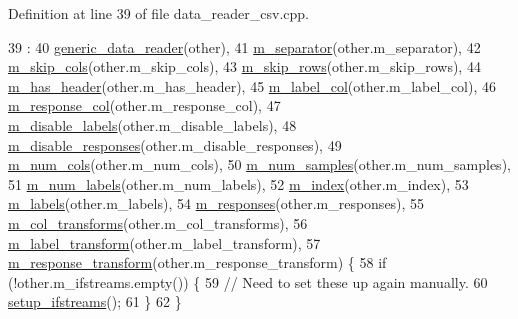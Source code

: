 Definition at line 39 of file data\+\_\+reader\+\_\+csv.\+cpp.


\begin{DoxyCode}
39                                               :
40   \hyperlink{classlbann_1_1generic__data__reader_aaba933b8f7c1227801f6e80d39986af4}{generic\_data\_reader}(other),
41   \hyperlink{classlbann_1_1csv__reader_abab4a731daa751856f083c117ac8862a}{m\_separator}(other.m\_separator),
42   \hyperlink{classlbann_1_1csv__reader_a3a6cb698fbeb4abd0032e2b018bbb326}{m\_skip\_cols}(other.m\_skip\_cols),
43   \hyperlink{classlbann_1_1csv__reader_a52b9eebd06309a8d8858ce74ecd8cce0}{m\_skip\_rows}(other.m\_skip\_rows),
44   \hyperlink{classlbann_1_1csv__reader_a36d5e554882e8a32e1d111701af3bd90}{m\_has\_header}(other.m\_has\_header),
45   \hyperlink{classlbann_1_1csv__reader_acc02e56c81421c4507f7178ca8461b04}{m\_label\_col}(other.m\_label\_col),
46   \hyperlink{classlbann_1_1csv__reader_a1cfa3562ecd0a7f6358290f299de5812}{m\_response\_col}(other.m\_response\_col),
47   \hyperlink{classlbann_1_1csv__reader_a5f013485fc1466dcf1f78ef020b845d4}{m\_disable\_labels}(other.m\_disable\_labels),
48   \hyperlink{classlbann_1_1csv__reader_a1e133c3585df5f131b4772f618e77ad2}{m\_disable\_responses}(other.m\_disable\_responses),
49   \hyperlink{classlbann_1_1csv__reader_a7607d3f6b356538671147a0b8f7b09c8}{m\_num\_cols}(other.m\_num\_cols),
50   \hyperlink{classlbann_1_1csv__reader_a37ee216c31ea3d7919fce58215ec410a}{m\_num\_samples}(other.m\_num\_samples),
51   \hyperlink{classlbann_1_1csv__reader_a8e377a058039b3d906738143356b93e4}{m\_num\_labels}(other.m\_num\_labels),
52   \hyperlink{classlbann_1_1csv__reader_a2a959e7839d2d11e2deba98ba1884006}{m\_index}(other.m\_index),
53   \hyperlink{classlbann_1_1csv__reader_a1f11d02df556a4ec638f332ccfc03eb2}{m\_labels}(other.m\_labels),
54   \hyperlink{classlbann_1_1csv__reader_a8b7e23827c7cbf7c8eff40cad9cb6afc}{m\_responses}(other.m\_responses),
55   \hyperlink{classlbann_1_1csv__reader_aad98a20225b1f2545de32b4c19c8285b}{m\_col\_transforms}(other.m\_col\_transforms),
56   \hyperlink{classlbann_1_1csv__reader_aa9b671a172828980cb9c91180c3d0ad8}{m\_label\_transform}(other.m\_label\_transform),
57   \hyperlink{classlbann_1_1csv__reader_a161c3606668efbc8910cad2f7fa01ed3}{m\_response\_transform}(other.m\_response\_transform) \{
58   \textcolor{keywordflow}{if} (!other.m\_ifstreams.empty()) \{
59     \textcolor{comment}{// Need to set these up again manually.}
60     \hyperlink{classlbann_1_1csv__reader_afc689f206192339770ee9fbd132492bb}{setup\_ifstreams}();
61   \}
62 \}
\end{DoxyCode}
